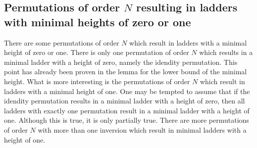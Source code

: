 \begin{center}
\begin{figure}[!htp]
        \end{figure}
   \end{center}

   \subsection{Permutations of order $N$ resulting in ladders with minimal heights of zero or one}
   There are some permutations of order $N$ which result in ladders with a minimal height of zero or one.
   There is only one permutation of order $N$ which results in a minimal ladder with a height of zero, 
   namely the idendity permutation. This point has already been proven in the lemma for the lower bound of the 
   minimal height. What is more interesting is the permutations of order $N$ which result in ladders with 
   a minimal height of one. One may be tempted to assume that if the idendity permutation results in a minimal ladder 
   with a height of zero, then all ladders with exactly one permutation result in a minimal ladder with a height of one.
   Although this is true, it is only partially true. There are more permutations of order $N$ with more than one inversion 
   which result in minimal ladders with a height of one.